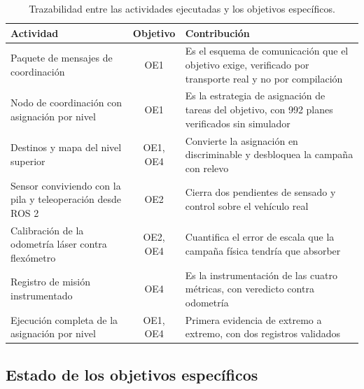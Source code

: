 \documentclass[12pt,letterpaper]{article}
\begin{document}
\begin{table}[H]
    \centering
    \small
    \caption{Trazabilidad entre las actividades ejecutadas y los objetivos específicos.}
    \label{tab:trazabilidad}
    \begin{tabular}{@{}p{4.0cm}cp{7.6cm}@{}}
        \toprule
        \textbf{Actividad} & \textbf{Objetivo} & \textbf{Contribución} \\ \midrule
        Paquete de mensajes de coordinación & OE1 & Es el esquema de comunicación que el objetivo exige, verificado por transporte real y no por compilación \\ \addlinespace
        Nodo de coordinación con asignación por nivel & OE1 & Es la estrategia de asignación de tareas del objetivo, con 992 planes verificados sin simulador \\ \addlinespace
        Destinos y mapa del nivel superior & OE1, OE4 & Convierte la asignación en discriminable y desbloquea la campaña con relevo \\ \addlinespace
        Sensor conviviendo con la pila y teleoperación desde ROS 2 & OE2 & Cierra dos pendientes de sensado y control sobre el vehículo real \\ \addlinespace
        Calibración de la odometría láser contra flexómetro & OE2, OE4 & Cuantifica el error de escala que la campaña física tendría que absorber \\ \addlinespace
        Registro de misión instrumentado & OE4 & Es la instrumentación de las cuatro métricas, con veredicto contra odometría \\ \addlinespace
        Ejecución completa de la asignación por nivel & OE1, OE4 & Primera evidencia de extremo a extremo, con dos registros validados \\ \bottomrule
    \end{tabular}
\end{table}

\subsection{Estado de los objetivos específicos}
\end{document}
